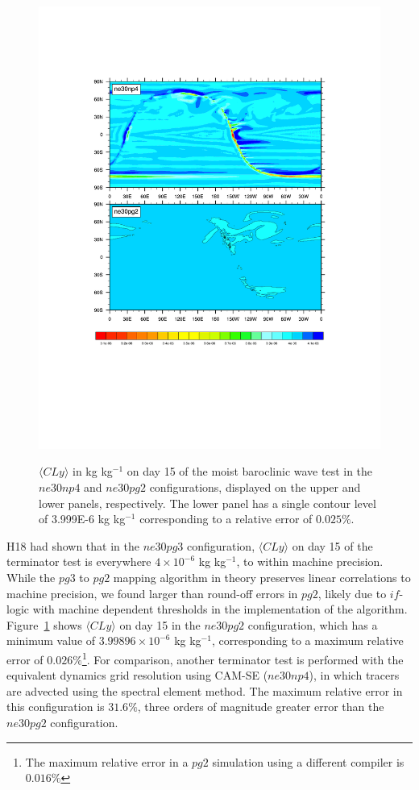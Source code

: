 \documentclass[draft,linenumbers]{agujournal}
\begin{document}
\begin{figure}[t]
\begin{center}
\noindent\includegraphics[width=30pc,angle=0]{temp_terminator.pdf}\\
\end{center}
\caption{$\langle CLy \rangle$ in kg kg$^{-1}$ on day 15 of the moist baroclinic wave test in the $ne30np4$ and $ne30pg2$ configurations, displayed on the upper and lower panels, respectively. The lower panel has a single contour level of 3.999E-6 kg kg$^{-1}$ corresponding to a relative error of $0.025\%$.}
\label{fig:terminator}
\end{figure}

H18 had shown that in the $ne30pg3$ configuration, $\langle CLy \rangle$ on day 15 of the terminator test is everywhere $4\times10^{-6}$ kg kg$^{-1}$, to within machine precision. While the $pg3$ to $pg2$ mapping algorithm in theory preserves linear correlations to machine precision, we found larger than round-off errors in $pg2$, likely due to $if$-logic with machine dependent thresholds in the implementation of the algorithm. Figure~\ref{fig:terminator} shows $\langle CLy \rangle$ on day 15 in the $ne30pg2$ configuration, which has a minimum value of $3.99896\times10^{-6}$ kg kg$^{-1}$, corresponding to a maximum relative error of $0.026\%$\footnote{The maximum relative error in a $pg2$ simulation using a different compiler is $0.016\%$}. For comparison, another terminator test is performed with the equivalent dynamics grid resolution using CAM-SE ($ne30np4$), in which tracers are advected using the spectral element method. The maximum relative error in this configuration is $31.6\%$, three orders of magnitude greater error than the $ne30pg2$ configuration.
\end{document}
